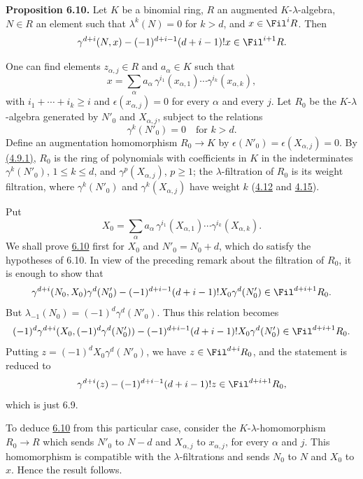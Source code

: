 \textbf{Proposition 6.10.} Let \(K\) be a binomial ring, \(R\) an augmented \(K\)-\(\lambda\)-algebra, \(N\in R\) an element such that \(\lambda^k(N)=0\) for \(k>d\), and \(x\in\Fil^iR\). Then
\[
  \gamma^{d+i}(N,x)-(-1)^{d+i-1}(d+i-1)!x\in\Fil^{i+1}R.
\]

One can find elements \(z_{\alpha,j}\in R\) and \(a_\alpha\in K\) such that
\[
  x=\sum_\alpha a_\alpha\,
       \gamma^{i_1}(x_{\alpha,1})\cdots
       \gamma^{i_k}(x_{\alpha,k}),
\]
with \(i_1+\cdots+i_k\ge i\) and \(\epsilon(x_{\alpha,j})=0\) for every \(\alpha\) and every \(j\). Let \(R_0\) be the \(K\)-\(\lambda\)-algebra generated by \(N'_0\) and \(X_{\alpha,j}\), subject to the relations
\[
  \gamma^k(N'_0)=0\quad\text{for }k>d.
\]
Define an augmentation homomorphism \(R_0\to K\) by \(\epsilon(N'_0)=\epsilon(X_{\alpha,j})=0\). By \hyperlink{sga6.e05.cor.4-9}{(4.9.1)}, \(R_0\) is the ring of polynomials with coefficients in \(K\) in the indeterminates \(\gamma^k(N'_0)\), \(1\le k\le d\), and \(\gamma^p(X_{\alpha,j})\), \(p\ge1\); the \(\lambda\)-filtration of \(R_0\) is its weight filtration, where \(\gamma^k(N'_0)\) and \(\gamma^k(X_{\alpha,j})\) have weight \(k\) (\hyperlink{sga6.e05.prop.4-12}{4.12} and \hyperlink{sga6.e05.cor.4-15}{4.15}).

Put
\[
  X_0=\sum_\alpha a_\alpha\,
       \gamma^{i_1}(X_{\alpha,1})\cdots
       \gamma^{i_k}(X_{\alpha,k}).
\]
We shall prove \hyperlink{sga6.e05.prop.6-10}{6.10} first for \(X_0\) and \(N'_0=N_0+d\), which do satisfy the hypotheses of 6.10. In view of the preceding remark about the filtration of \(R_0\), it is enough to show that
\[
  \gamma^{d+i}(N_0,X_0)\gamma^d(N'_0)
  -
  (-1)^{d+i-1}(d+i-1)!X_0\gamma^d(N'_0)
  \in\Fil^{d+i+1}R_0 .
\]
But \(\lambda_{-1}(N_0)=(-1)^d\gamma^d(N'_0)\). Thus this relation becomes
\[
  (-1)^d\gamma^{d+i}(X_0,(-1)^d\gamma^d(N'_0))
  -
  (-1)^{d+i-1}(d+i-1)!X_0\gamma^d(N'_0)
  \in\Fil^{d+i+1}R_0 .
\]
Putting \(z=(-1)^dX_0\gamma^d(N'_0)\), we have \(z\in\Fil^{d+i}R_0\), and the statement is reduced to
\[
  \gamma^{d+i}(z)-(-1)^{d+i-1}(d+i-1)!z\in\Fil^{d+i+1}R_0,
\]
which is just 6.9.

To deduce \hyperlink{sga6.e05.prop.6-10}{6.10} from this particular case, consider the \(K\)-\(\lambda\)-homomorphism \(R_0\to R\) which sends \(N'_0\) to \(N-d\) and \(X_{\alpha,j}\) to \(x_{\alpha,j}\), for every \(\alpha\) and \(j\). This homomorphism is compatible with the \(\lambda\)-filtrations and sends \(N_0\) to \(N\) and \(X_0\) to \(x\). Hence the result follows.

